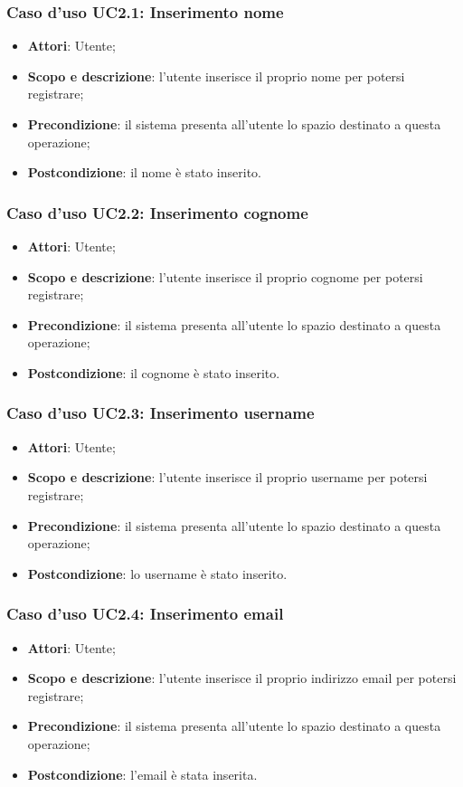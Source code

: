 \subsubsection{Caso d'uso UC2.1: Inserimento nome}
\begin{itemize}
\item \textbf{Attori}: Utente;
\item \textbf{Scopo e descrizione}: l'utente inserisce il proprio nome per potersi registrare;
\item \textbf{Precondizione}: il sistema presenta all'utente lo spazio destinato a questa operazione;
\item \textbf{Postcondizione}: il nome è stato inserito.
\end{itemize}

\subsubsection{Caso d'uso UC2.2: Inserimento cognome}
\begin{itemize}
\item \textbf{Attori}: Utente;
\item \textbf{Scopo e descrizione}: l'utente inserisce il proprio cognome per potersi registrare;
\item \textbf{Precondizione}: il sistema presenta all'utente lo spazio destinato a questa operazione;
\item \textbf{Postcondizione}: il cognome è stato inserito.
\end{itemize}

\subsubsection{Caso d'uso UC2.3: Inserimento username}
\begin{itemize}
\item \textbf{Attori}: Utente;
\item \textbf{Scopo e descrizione}: l'utente inserisce il proprio username per potersi registrare;
\item \textbf{Precondizione}: il sistema presenta all'utente lo spazio destinato a questa operazione;
\item \textbf{Postcondizione}: lo username è stato inserito.
\end{itemize}

\subsubsection{Caso d'uso UC2.4: Inserimento email}
\begin{itemize}
\item \textbf{Attori}: Utente;
\item \textbf{Scopo e descrizione}: l'utente inserisce il proprio indirizzo email per potersi registrare;
\item \textbf{Precondizione}: il sistema presenta all'utente lo spazio destinato a questa operazione;
\item \textbf{Postcondizione}: l'email è stata inserita.
\end{itemize}

